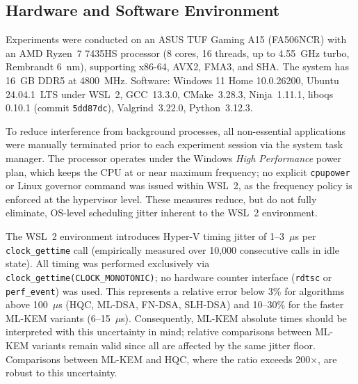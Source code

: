 \documentclass[12pt]{article}
\begin{document}
\subsection{Hardware and Software Environment}
Experiments were conducted on an ASUS TUF Gaming A15 (FA506NCR) with an
AMD Ryzen~7 7435HS processor (8 cores, 16 threads, up to 4.55~GHz turbo,
Rembrandt 6~nm), supporting x86-64, AVX2, FMA3, and SHA. The system has
16~GB DDR5 at 4800~MHz. Software: Windows 11 Home 10.0.26200, Ubuntu
24.04.1~LTS under WSL~2, GCC~13.3.0, CMake~3.28.3, Ninja~1.11.1, liboqs
0.10.1 (commit \texttt{5dd87dc}), Valgrind~3.22.0, Python~3.12.3.

To reduce interference from background processes, all non-essential
applications were manually terminated prior to each experiment session via
the system task manager. The processor operates under the Windows
\textit{High Performance} power plan, which keeps the CPU at or near
maximum frequency; no explicit \texttt{cpupower} or Linux governor command
was issued within WSL~2, as the frequency policy is enforced at the
hypervisor level. These measures reduce, but do not fully eliminate,
OS-level scheduling jitter inherent to the WSL~2 environment.

The WSL~2 environment introduces Hyper-V timing jitter of 1--3~$\mu$s per
\texttt{clock\_gettime} call (empirically measured over 10,000 consecutive
calls in idle state). All timing was performed exclusively via
\texttt{clock\_gettime(CLOCK\_MONOTONIC)}; no hardware counter interface
(\texttt{rdtsc} or \texttt{perf\_event}) was used. This represents a
relative error below 3\% for algorithms above 100~$\mu$s (HQC, ML-DSA,
FN-DSA, SLH-DSA) and 10--30\% for the faster ML-KEM variants (6--15~$\mu$s).
Consequently, ML-KEM absolute times should be interpreted with this
uncertainty in mind; relative comparisons between ML-KEM variants remain
valid since all are affected by the same jitter floor. Comparisons between
ML-KEM and HQC, where the ratio exceeds 200$\times$, are robust to this
uncertainty.
\end{document}
